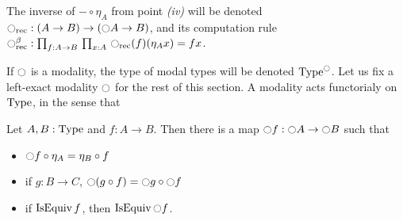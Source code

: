\begin{nota}
  The inverse of $- \circ \eta_A$ from point {\itshape (iv)} will be
  denoted $\ocircle_{\mathrm{rec}}: (A\to B) \to (\ocircle A \to B)$, and its
  computation rule $\ocircle_{\mathrm{rec}}^\beta : \prod_{f:A \to B}\, \prod_{x:A}\, \ocircle_{\mathrm{rec}}(f) (\eta_A x) = f x$.
\end{nota}

If $\ocircle$ is a modality, the type of modal types will be denoted
$\operatorname{Type}^{\ocircle}$. Let us fix a left-exact modality $\ocircle$ for the rest
of this section. A modality acts functorialy on $\operatorname{Type}$, in the sense
that

\begin{lem}
  Let $A,B:\operatorname{Type}$ and $f:A\to B$. Then there is a map $\ocircle f:\ocircle
  A \to \ocircle B$ such that 
  \begin{itemize}
  \item $\ocircle f \circ \eta_A = \eta_B \circ f$
  \item if $g:B\to C$, $\ocircle (g \circ f) = \ocircle g \circ \ocircle f$
  \item if $\operatorname{IsEquiv} f$, then $\operatorname{IsEquiv} \ocircle f$.
  \end{itemize}
\end{lem}

